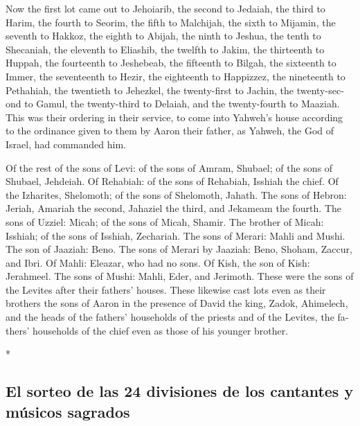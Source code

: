 \begin{paracol}{2}
\begin{otherlanguage}{english}
 Now the first lot came out to Jehoiarib, the second to
Jedaiah,  the third to Harim, the fourth to Seorim,
 the fifth to Malchijah, the sixth to Mijamin,
 the seventh to Hakkoz, the eighth to Abijah,
 the ninth to Jeshua, the tenth to Shecaniah,
 the eleventh to Eliashib, the twelfth to Jakim,
 the thirteenth to Huppah, the fourteenth to Jeshebeab,
 the fifteenth to Bilgah, the sixteenth to Immer,
 the seventeenth to Hezir, the eighteenth to Happizzez,
 the nineteenth to Pethahiah, the twentieth to Jehezkel,
 the twenty-first to Jachin, the twenty-second to Gamul,
 the twenty-third to Delaiah, and the twenty-fourth to
Maaziah.  This was their ordering in their service, to
come into Yahweh's house according to the ordinance given to them by
Aaron their father, as Yahweh, the God of Israel, had commanded him.

 Of the rest of the sons of Levi: of the sons of Amram,
Shubael; of the sons of Shubael, Jehdeiah.  Of Rehabiah:
of the sons of Rehabiah, Isshiah the chief.  Of the
Izharites, Shelomoth; of the sons of Shelomoth, Jahath. 
The sons of Hebron: Jeriah, Amariah the second, Jahaziel the third, and
Jekameam the fourth.  The sons of Uzziel: Micah; of the
sons of Micah, Shamir.  The brother of Micah: Isshiah; of
the sons of Isshiah, Zechariah.  The sons of Merari:
Mahli and Mushi. The son of Jaaziah: Beno.  The sons of
Merari by Jaaziah: Beno, Shoham, Zaccur, and Ibri.  Of
Mahli: Eleazar, who had no sons.  Of Kish, the son of
Kish: Jerahmeel.  The sons of Mushi: Mahli, Eder, and
Jerimoth. These were the sons of the Levites after their fathers'
houses.  These likewise cast lots even as their brothers
the sons of Aaron in the presence of David the king, Zadok, Ahimelech,
and the heads of the fathers' households of the priests and of the
Levites, the fathers' households of the chief even as those of his
younger brother.

\end{otherlanguage}

\switchcolumn[0]*

\hypertarget{el-sorteo-de-las-24-divisiones-de-los-cantantes-y-muxfasicos-sagrados}{%
\subsection{El sorteo de las 24 divisiones de los cantantes y músicos
sagrados}\label{el-sorteo-de-las-24-divisiones-de-los-cantantes-y-muxfasicos-sagrados}}


\end{paracol}
